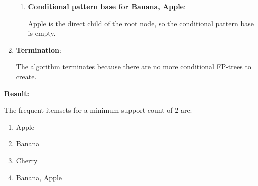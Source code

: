 \documentclass[
english,
smallborders
]{i6prcsht}
\begin{document}
\begin{solution}
\begin{enumerate}
		      \begin{enumerate}
			      \item \textbf{Conditional pattern base for \glqq Banana, Apple\grqq }:

			            Apple is the direct child of the root node, so the conditional pattern base is empty.
		      \end{enumerate}


		\item \textbf{Termination}:

		      The algorithm terminates because there are no more conditional FP-trees to create.

	\end{enumerate}

	\textbf{Result:}

	\vspace*{-0.2cm}

	The frequent itemsets for a minimum support count of 2 are:

	\begin{multicols}{4}
		\begin{enumerate}
			\item Apple
			\item Banana
			\item Cherry
			\item Banana, Apple
		\end{enumerate}
	\end{multicols}

\end{solution}
\end{document}
